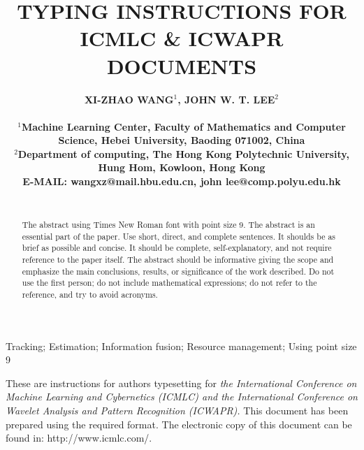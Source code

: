 \documentclass[a4paper, times, 10pt,twocolumn]{article}
\begin{document}
\title{TYPING INSTRUCTIONS FOR ICMLC \& ICWAPR DOCUMENTS}  %

\author{\bf{\normalsize{XI-ZHAO WANG${^1}$, JOHN W. T. LEE${^2}$}}\\ %
\\
\normalsize{$^1$Machine Learning Center, Faculty of Mathematics and Computer Science, Hebei University, Baoding 071002, China}\\
\normalsize{$^2$Department of computing, The Hong Kong Polytechnic University, Hung Hom, Kowloon, Hong Kong} \\
\normalsize{E-MAIL: wangxz@mail.hbu.edu.cn, john lee@comp.polyu.edu.hk }\\
\\}


\maketitle \thispagestyle{empty}

\begin{abstract}
   {The abstract using Times New Roman font with point size 9. The abstract is an essential part of the paper. Use short, direct, and complete sentences. It shoulds be as brief as possible and concise. It should be complete, self-explanatory, and not require reference to the paper itself. The abstract should be informative giving the scope and emphasize the main conclusions, results, or significance of the work described. Do not use the first person; do not include mathematical expressions; do not refer to the reference, and try to avoid acronyms.}
\end{abstract}
\begin{keywords}
   {Tracking; Estimation; Information fusion; Resource
    management; Using point size 9}
\end{keywords}


These are instructions for authors typesetting for {\it the International Conference on Machine Learning and Cybernetics (ICMLC) and the International Conference on Wavelet Analysis and Pattern Recognition (ICWAPR).} This document has been prepared using the required format. The electronic copy of this document can be found in: http://www.icmlc.com/.
\end{document}
